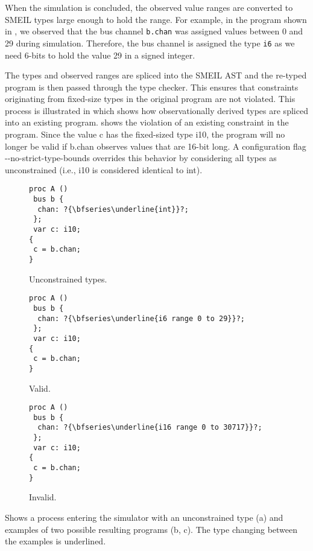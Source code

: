 When the simulation is concluded, the observed value ranges are converted to
SMEIL types large enough to hold the range.  For example, in the program shown
in , we observed that the bus channel {\tt b.chan} was
assigned values between 0 and 29 during simulation. Therefore, the bus channel
is assigned the type {\tt i6} as we need 6-bits to hold the value 29 in a signed
integer.

The types and observed ranges are spliced into the SMEIL AST and the re-typed
program is then passed through the type checker. This ensures that constraints
originating from fixed-size types in the original program are not violated. This
process is illustrated in  which shows how observationally
derived types are spliced into an existing program.  shows
the violation of an existing constraint in the program. Since the value
{\ttfamily c} has the fixed-sized type {\ttfamily i10}, the program will no
longer be valid if {\ttfamily b.chan} observes values that are 16-bit long. A
configuration flag {\ttfamily -{}-no-strict-type-bounds} overrides this behavior
by considering all types as unconstrained (i.e., {\ttfamily i10} is considered
identical to {\ttfamily int}).


\begin{widefigure}
  \centering
  \begin{subfigure}[t]{0.30\linewidth}
\begin{lstlisting}[language=smeil]
proc A ()
 bus b {
  chan: ?{\bfseries\underline{int}}?;
 };
 var c: i10;
{
 c = b.chan;
}
\end{lstlisting}
    \caption{Unconstrained types.}
    \label{fig:oktype}
  \end{subfigure}
  \begin{subfigure}[t]{0.30\linewidth}
    \begin{lstlisting}[language=smeil]
proc A ()
 bus b {
  chan: ?{\bfseries\underline{i6 range 0 to 29}}?;
 };
 var c: i10;
{
 c = b.chan;
}
    \end{lstlisting}
    \caption{Valid.}
    \label{fig:non-violated}
  \end{subfigure}
  \begin{subfigure}[t]{0.30\linewidth}
    \begin{lstlisting}[language=smeil]
proc A ()
 bus b {
  chan: ?{\bfseries\underline{i16 range 0 to 30717}}?;
 };
 var c: i10;
{
 c = b.chan;
}
\end{lstlisting}
    \caption{Invalid.}
    \label{fig:violated}
  \end{subfigure}
  \caption{Shows a process entering the simulator with an unconstrained type (a)
    and examples of two possible resulting programs (b, c). The type changing
    between the examples is underlined.}
  \label{fig:simtyping}
\end{widefigure}

